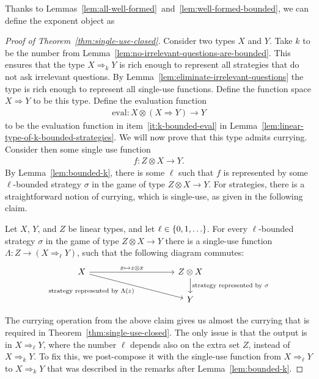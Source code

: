 Thanks to Lemmas~\ref{lem:all-well-formed}~and~\ref{lem:well-formed-bounded}, we can define the exponent object 
as 




\begin{proof}[Proof of Theorem~\ref{thm:single-use-closed}]
    Consider two types $X$ and $Y$.
 Take $k$ to be the number from Lemma~\ref{lem:no-irrelevant-questions-are-bounded}. This ensures that the type $X \Rightarrow_k Y$ is rich enough to represent all strategies that do not ask irrelevant questions. By Lemma~\ref{lem:eliminate-irrelevant-questions} the type is  rich enough to represent all single-use functions. Define the  function space $X \Rightarrow Y$ to be this type.   Define the evaluation function 
    \begin{align*}
    \text{eval} : X \otimes (X \Rightarrow Y) \to Y 
    \end{align*}
    to be the evaluation function in item~\ref{it:k-bounded-eval} in Lemma~\ref{lem:linear-type-of-k-bounded-strategies}. We will now prove that this type admits currying. Consider then some single use function 
    \begin{align*}
    f : Z \otimes X \to Y.
    \end{align*}
    By Lemma~\ref{lem:bounded-k}, there is some $\ell$ such that $f$ is represented by some  $\ell$-bounded strategy $\sigma$ in the game of type $Z \otimes X \to Y$. For strategies, there is a straightforward notion of currying, which is single-use, as given in the following claim.

    \begin{claim}
        Let $X$, $Y$, and $Z$ be linear types, and let $\ell \in \{0,1,\ldots\}$. For every $\ell$-bounded strategy $\sigma$ in the game  of type $Z \otimes X \to Y$  there is a single-use function $\Lambda : Z \to (X \Rightarrow_\ell Y)$, such that the following diagram commutes:
        \[
        \begin{tikzcd}
            [column sep=3.5cm]
        X
        \ar[r, "{x \mapsto z \otimes x}"]
        \ar[dr, "\text{strategy represented by $\Lambda(z)$}"']
        &
        Z \otimes X 
        \ar[d, "{\text{strategy represented by $\sigma$}}"] \\
        &
        Y
        \end{tikzcd}
        \]
        \end{claim}
        The currying operation from the above claim gives us almost the currying that is required in Theorem~\ref{thm:single-use-closed}.
        The only issue is that the output is in $X \Rightarrow_\ell Y$, where the number $\ell$ depends also on the extra set $Z$, instead of $X \Rightarrow_k Y$.
        To fix this, we post-compose it with the single-use function from $X \Rightarrow_\ell Y$ to $X \Rightarrow_k Y$  that was described in the remarks after Lemma~\ref{lem:bounded-k}.

    

\end{proof}